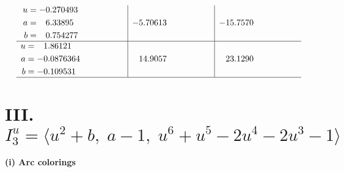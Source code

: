 \documentclass[1p]{elsarticle_modified}
\theoremstyle{definition}
\begin{document}
$$\begin{array}{c|c|c}
\begin{aligned}
u &= -0.270493\phantom{ +0.000000I} \\
a &= \phantom{-}6.33895\phantom{ +0.000000I} \\
b &= \phantom{-}0.754277\phantom{ +0.000000I}\end{aligned}
 & -5.70613\phantom{ +0.000000I} & -15.7570\phantom{ +0.000000I} \\ \hline\begin{aligned}
u &= \phantom{-}1.86121\phantom{ +0.000000I} \\
a &= -0.0876364\phantom{ +0.000000I} \\
b &= -0.109531\phantom{ +0.000000I}\end{aligned}
 & \phantom{-}14.9057\phantom{ +0.000000I} & \phantom{-}23.1290\phantom{ +0.000000I}\\
 \hline 
 \end{array}$$\newpage\newpage\renewcommand{\arraystretch}{1}
\centering \section*{III. $I^u_{3}= \langle u^2+b,\;a-1,\;u^6+u^5-2 u^4-2 u^3-1 \rangle$}
\flushleft \textbf{(i) Arc colorings}\\
\end{document}
